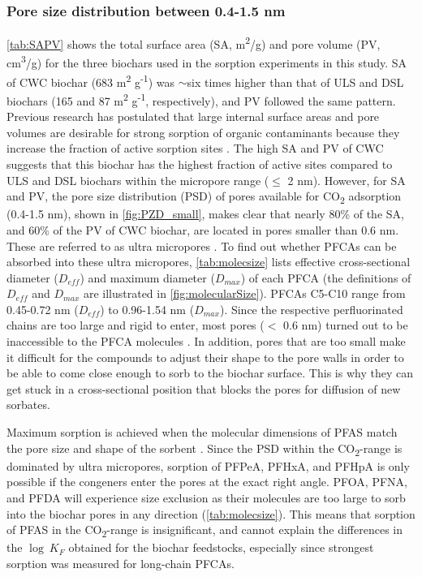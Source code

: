 \subsubsection{Pore size distribution between 0.4-1.5 nm}
\cref{tab:SAPV} shows the total surface area (SA, m\textsuperscript{2}/g) and pore volume (PV, cm\textsuperscript{3}/g) for the three biochars used in the sorption experiments in this study. SA of CWC biochar (683 m\textsuperscript{2} g\textsuperscript{-1}) was $\sim$six times higher than that of ULS and DSL biochars (165 and 87  m\textsuperscript{2} g\textsuperscript{-1}, respectively), and PV followed the same pattern. Previous research has postulated that large internal surface areas and pore volumes are desirable for strong sorption of organic contaminants because they increase the fraction of active sorption sites \citep{ahmed2020per,Hale2016}. The high SA and PV of CWC suggests that this biochar has the highest fraction of active sites compared to ULS and DSL biochars within the micropore range ($\le$ 2 nm). However, for SA and PV, the pore size distribution (PSD) of pores available for CO\textsubscript{2} adsorption (0.4-1.5 nm), shown in \cref{fig:PZD_small}, makes clear that nearly 80\% of the SA, and 60\% of the PV of CWC biochar, are located in pores smaller than 0.6 nm. These are referred to as ultra micropores \citep{bardestani2019experimental}. To find out whether PFCAs can be absorbed into these ultra micropores, \cref{tab:molecsize} lists effective cross-sectional diameter ($D_{eff}$) and maximum diameter ($D_{max}$) of each PFCA (the definitions of $D_{eff}$ and $D_{max}$ are illustrated in \cref{fig:molecularSize}). PFCAs C5-C10 range from 0.45-0.72 nm ($D_{eff}$) to 0.96-1.54 nm ($D_{max}$). Since the respective perfluorinated chains are too large and rigid to enter, most pores ($<$ 0.6 nm) turned out to be inaccessible to the PFCA molecules \citep{yu2009sorption}. In addition, pores that are too small make it difficult for the compounds to adjust their shape to the pore walls in order to be able to come close enough to sorb to the biochar surface. This is why they can get stuck in a cross-sectional position that blocks the pores for diffusion of new sorbates. 

Maximum sorption is achieved when the molecular dimensions of PFAS match the pore size and shape of the sorbent \citep{Hale2016}. Since the \acrshort{PSD} within the CO\textsubscript{2}-range is dominated by ultra micropores, sorption of PFPeA, PFHxA, and PFHpA is only possible if the congeners enter the pores at the exact right angle. PFOA, PFNA, and PFDA will experience size exclusion as their molecules are too large to sorb into the biochar pores in any direction (\cref{tab:molecsize}). This means that sorption of PFAS in the CO\textsubscript{2}-range is insignificant, and cannot explain the differences in the $\log~K_F$ obtained for the biochar feedstocks, especially since strongest sorption was measured for long-chain PFCAs.

